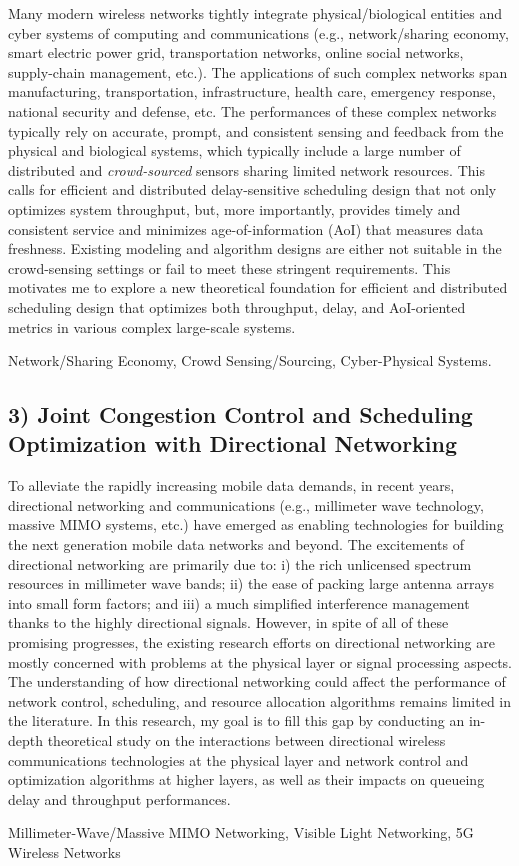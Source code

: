 \documentclass[10pt]{article}
\theoremstyle{plain} \numberwithin{equation}{section}
\theoremstyle{definition}
\begin{document}
Many modern wireless networks tightly integrate physical/biological entities and cyber systems of computing and communications (e.g., network/sharing economy, smart electric power grid, transportation networks, online social networks, supply-chain management, etc.).
The applications of such complex networks span manufacturing, transportation, infrastructure, health care, emergency response, national security and defense, etc. 
The performances of these complex networks typically rely on accurate, prompt, and consistent sensing and feedback from the physical and biological systems, which typically include a large number of distributed and {\em crowd-sourced} sensors sharing limited network resources.
This calls for efficient and distributed delay-sensitive scheduling design that not only optimizes system throughput, but, more importantly, provides timely and consistent service and minimizes age-of-information (AoI) that measures data freshness. 
Existing modeling and algorithm designs are either not suitable in the crowd-sensing settings or fail to meet these stringent requirements. 
This motivates me to explore a new theoretical foundation for efficient and distributed scheduling design that optimizes both throughput, delay, and AoI-oriented metrics in various complex large-scale systems.

\smallskip
{} Network/Sharing Economy, Crowd Sensing/Sourcing, Cyber-Physical Systems.


\subsection*{3) Joint Congestion Control and Scheduling Optimization with Directional Networking}

To alleviate the rapidly increasing mobile data demands, in recent years, directional networking and communications (e.g., millimeter wave technology, massive MIMO systems, etc.) have emerged as enabling technologies for building the next generation mobile data networks and beyond. 
The excitements of directional networking are primarily due to: i) the rich unlicensed
spectrum resources in millimeter wave bands; ii) the ease of packing large antenna arrays into small form factors; and iii) a much simplified interference management thanks to the highly directional signals. 
However, in spite of all of these promising progresses, the existing research efforts on directional networking are mostly concerned with problems at the physical layer or signal processing aspects. 
The understanding of how directional networking could affect the performance of network control, scheduling, and resource allocation algorithms remains limited
in the literature. 
In this research, my goal is to fill this gap by conducting an in-depth theoretical study on the interactions
between directional wireless communications technologies at the physical layer and network control and optimization algorithms at higher layers, as well as their
impacts on queueing delay and throughput performances.

\smallskip
{} Millimeter-Wave/Massive MIMO Networking, Visible Light Networking, 5G Wireless Networks



%
{\small

}
\end{document}
